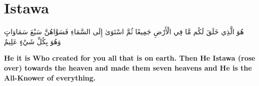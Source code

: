 \chapter{Istawa}
\begin{center}
    {\Huge    
        \begin{Arabic}
            هُوَ الَّذِي خَلَقَ لَكُم مَّا فِي الْأَرْضِ جَمِيعًا ثُمَّ اسْتَوَىٰ إِلَى السَّمَاءِ فَسَوَّاهُنَّ سَبْعَ سَمَاوَاتٍ وَهُوَ بِكُلِّ شَيْءٍ عَلِيمٌ
        \end{Arabic}
    }    
\end{center}
\vspace*{\fill}
\vspace{3cm}
\begin{center}
    \Large \textbf{He it is Who created for you all that is on earth. Then He Istawa (rose over) towards the heaven and made them seven heavens and He is the All-Knower of everything.}
\end{center}

